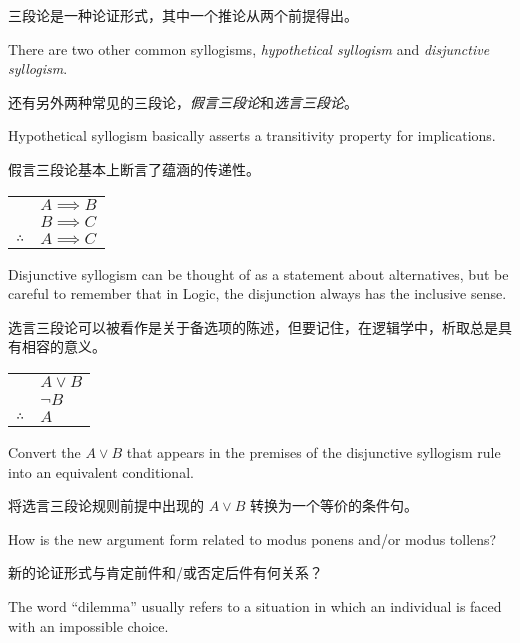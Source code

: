 三段论是一种论证形式，其中一个推论从两个前提得出。

There are two other common syllogisms, 
\emph{hypothetical syllogism} and
\emph{disjunctive syllogism}.

还有另外两种常见的三段论，\emph{假言三段论}和\emph{选言三段论}。

Hypothetical syllogism basically asserts a transitivity property for 
implications.

假言三段论基本上断言了蕴涵的传递性。

\begin{center}
\begin{tabular}{cl}
 & $A \implies B$ \\
 & $B \implies C$ \\ \hline
$\therefore$ & $A \implies C$ \\
\end{tabular}
\end{center}

Disjunctive syllogism can be thought of as a statement about
alternatives, but be careful to remember that in Logic, the disjunction
always has the inclusive sense.

选言三段论可以被看作是关于备选项的陈述，但要记住，在逻辑学中，析取总是具有相容的意义。

\begin{center}
\begin{tabular}{cl}
 & $A \lor B$ \\
 & ${\lnot}B$ \\ \hline
$\therefore$ & $A$ \\
\end{tabular}
\end{center}

\begin{exer}
Convert the $A \lor B$ that appears in the premises of the disjunctive
syllogism rule into an equivalent conditional.

将选言三段论规则前提中出现的 $A \lor B$ 转换为一个等价的条件句。

How is the new argument
form related to modus ponens and/or modus tollens?

新的论证形式与肯定前件和/或否定后件有何关系？
\end{exer}
 
The word ``dilemma'' usually refers to a situation in which an individual
is faced with an impossible choice.

